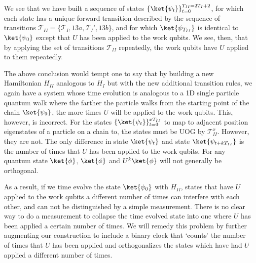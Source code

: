 \documentclass[11pt,letterpaper]{article}
\newcommand{\<}{\langle}
\renewcommand{\>}{\rangle}
\begin{document}
We see that we have built a sequence of states $\left\{\ket{\psi_t}\right\}_{t=0}^{T_{II}=2T_I+2}$, for which each state has a unique forward transition described by the sequence of transitions $\mathcal{T}_{II}=\{\mathcal{T}_I,13a,\mathcal{T}_I',13b\}$, and for which $\ket{\psi_{T_{II}}}$ is identical to $\ket{\psi_0}$ except that $U$ has been applied to the work qubits. We see, then, that by applying the set of transitions $\mathcal{T}_{II}$ repeatedly, the work qubits have $U$ applied to them repeatedly.

The above conclusion would tempt one to say that by building a new Hamiltonian $H_{II}$ analogous to $H_{I}$ but with the new additional transition rules, we again have a system whose time evolution is analogous to a 1D single particle quantum walk where the farther the particle walks from the starting point of the chain $\ket{\psi_0}$, the more times $U$ will be applied to the work qubits. This, however, is incorrect. For the states $\{\ket{\psi_t}\}_{t=0}^{xT_{II}}$ to map to adjacent position eigenstates of a particle on a chain to, the states must be UOG by $\mathcal{T}_{II}^x$. However, they are not. The only difference in state $\ket{\psi_t}$ and state $\ket{\psi_{t+kT_{II}}}$ is the number of times that $U$ has been applied to the work qubits. For any quantum state $\ket{\phi}$, $\ket{\phi}$ and $U^k\ket{\phi}$ will not generally be orthogonal.

As a result, if we time evolve the state $\ket{\psi_0}$ with $H_{II}$, states that have $U$ applied to the work qubits a different number of times can interfere with each other, and can not be distinguished by a simple measurement. There is no clear way to do a measurement to collapse the time evolved state into one where $U$ has been applied a certain number of times. We will remedy this problem by further augmenting our construction to include a binary clock that `counts' the number of times that $U$ has been applied and orthogonalizes the states which have had $U$ applied a different number of times.
\end{document}
